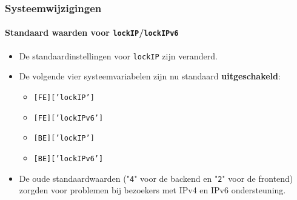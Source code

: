 
\begin{frame}[fragile]
	\frametitle{Systeemwijzigingen}
	\framesubtitle{Standaard waarden voor \texttt{lockIP}/\texttt{lockIPv6}}

	\lstset{basicstyle=\smaller\ttfamily}

	\begin{itemize}
		\item De standaardinstellingen voor \texttt{lockIP} zijn veranderd.
		\item De volgende vier systeemvariabelen zijn nu standaard \textbf{uitgeschakeld}:

			\begin{itemize}
				\item \texttt{[FE]['lockIP']}
				\item \texttt{[FE]['lockIPv6']}
				\item \texttt{[BE]['lockIP']}
				\item \texttt{[BE]['lockIPv6']}
			\end{itemize}

		\item De oude standaardwaarden ("\texttt{4}" voor de backend en "\texttt{2}" voor de frontend)
			zorgden voor problemen bij bezoekers met IPv4 en IPv6 ondersteuning.

	\end{itemize}

\end{frame}


